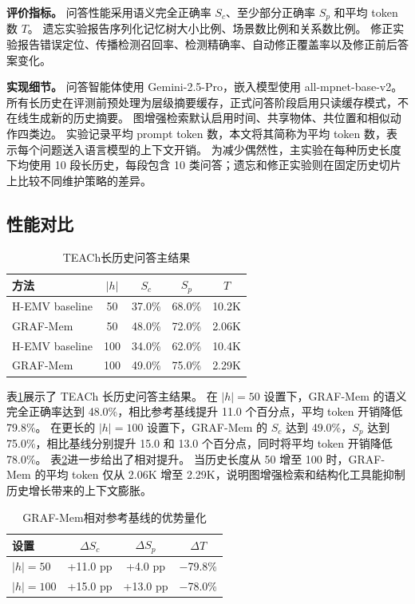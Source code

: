 \documentclass{cjc}
\begin{document}
\textbf{评价指标。}
问答性能采用语义完全正确率 $S_c$、至少部分正确率 $S_p$ 和平均 token 数 $T$。
遗忘实验报告序列化记忆树大小比例、场景数比例和关系数比例。
修正实验报告错误定位、传播检测召回率、检测精确率、自动修正覆盖率以及修正前后答案变化。

\textbf{实现细节。}
问答智能体使用 Gemini-2.5-Pro，嵌入模型使用 all-mpnet-base-v2。
所有长历史在评测前预处理为层级摘要缓存，正式问答阶段启用只读缓存模式，不在线生成新的历史摘要。
图增强检索默认启用时间、共享物体、共位置和相似动作四类边。
实验记录平均 prompt token 数，本文将其简称为平均 token 数，表示每个问题送入语言模型的上下文开销。
为减少偶然性，主实验在每种历史长度下均使用 10 段长历史，每段包含 10 类问答；遗忘和修正实验则在固定历史切片上比较不同维护策略的差异。

\subsection{性能对比}

\begin{table}[t]
  \centering
  \caption{TEACh长历史问答主结果}
  \label{tab:mainqa}
  \small
  \begin{tabular}{lcccc}
    \toprule
    方法 & $|h|$ & $S_c$ & $S_p$ & $T$ \\
    \midrule
    H-EMV baseline & 50  & 37.0\% & 68.0\% & 10.2K \\
    GRAF-Mem       & 50  & 48.0\% & 72.0\% & 2.06K \\
    H-EMV baseline & 100 & 34.0\% & 62.0\% & 10.4K \\
    GRAF-Mem       & 100 & 49.0\% & 75.0\% & 2.29K \\
    \bottomrule
  \end{tabular}
\end{table}

表\ref{tab:mainqa}展示了 TEACh 长历史问答主结果。
在 $|h|=50$ 设置下，GRAF-Mem 的语义完全正确率达到 48.0\%，相比参考基线提升 11.0 个百分点，平均 token 开销降低 79.8\%。
在更长的 $|h|=100$ 设置下，GRAF-Mem 的 $S_c$ 达到 49.0\%，$S_p$ 达到 75.0\%，相比基线分别提升 15.0 和 13.0 个百分点，同时将平均 token 开销降低 78.0\%。
表\ref{tab:gain}进一步给出了相对提升。
当历史长度从 50 增至 100 时，GRAF-Mem 的平均 token 仅从 2.06K 增至 2.29K，说明图增强检索和结构化工具能抑制历史增长带来的上下文膨胀。

\begin{table}[t]
  \centering
  \caption{GRAF-Mem相对参考基线的优势量化}
  \label{tab:gain}
  \small
  \begin{tabular}{lccc}
    \toprule
    设置 & $\Delta S_c$ & $\Delta S_p$ & $\Delta T$ \\
    \midrule
    $|h|=50$  & +11.0 pp & +4.0 pp  & $-$79.8\% \\
    $|h|=100$ & +15.0 pp & +13.0 pp & $-$78.0\% \\
    \bottomrule
  \end{tabular}
\end{table}
\end{document}
